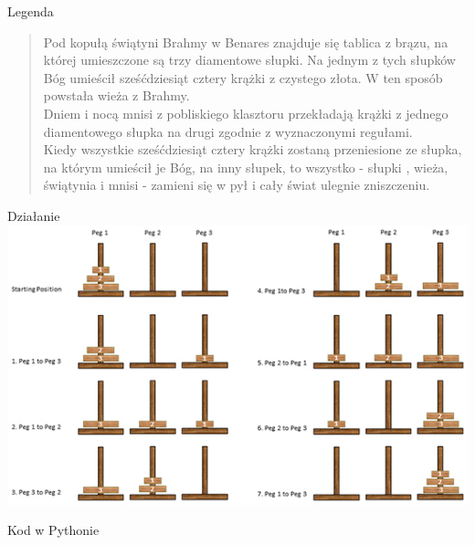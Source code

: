 \begin{frame}{Legenda}
    \begin{quote}
        \quad Pod kopułą świątyni Brahmy w Benares znajduje się tablica z brązu, na której umieszczone są trzy diamentowe słupki. Na jednym z tych słupków Bóg umieścił sześćdziesiąt cztery krążki z czystego złota. W ten sposób powstała wieża z Brahmy. \\
        \quad Dniem i nocą mnisi z pobliskiego klasztoru przekładają krążki z jednego diamentowego słupka na drugi zgodnie z wyznaczonymi regułami. \\
        \quad Kiedy wszystkie sześćdziesiąt cztery krążki zostaną przeniesione ze słupka, na którym umieścił je Bóg, na inny słupek, to wszystko - słupki , wieża, świątynia i mnisi - zamieni się w pył i cały świat ulegnie zniszczeniu.
    \end{quote}
\end{frame}
\begin{frame}{Działanie}
    \includegraphics[width=\textwidth,height=0.8\textheight]{recursion/graphics/hanoi_tower.jpg}
\end{frame}
\begin{frame}[fragile]{Kod w Pythonie}
    
\end{frame}
